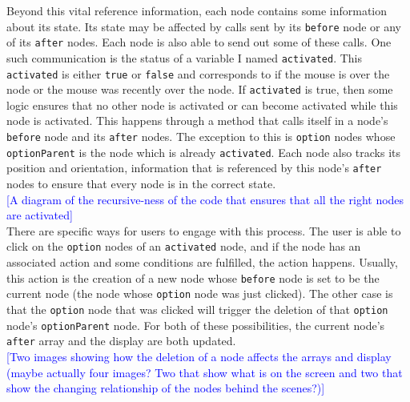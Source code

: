 \documentclass[12pt,twoside]{reedthesis}
\newcommand{\code}[1]{\texttt{#1}}
\begin{document}
	Beyond this vital reference information, each node contains some information about its state. Its state may be affected by calls sent by its \code{before} node or any of its \code{after} nodes. Each node is also able to send out some of these calls. One such communication is the status of a variable I named \code{activated}. This \code{activated} is either \code{true} or \code{false} and corresponds to if the mouse is over the node or the mouse was recently over the node. If \code{activated} is true, then some logic ensures that no other node is activated or can become activated while this node is activated. This happens through a method that calls itself in a node's \code{before} node and its \code{after} nodes. The exception to this is \code{option} nodes whose \code{optionParent} is the node which is already \code{activated}. Each node also tracks its position and orientation, information that is referenced by this node's \code{after} nodes to ensure that every node is in the correct state.\\
	
	\textcolor{blue}{[A diagram of the recursive-ness of the code that ensures that all the right nodes are activated]}\\
	
	There are specific ways for users to engage with this process. The user is able to click on the \code{option} nodes of an \code{activated} node, and if the node has an associated action and some conditions are fulfilled, the action happens. Usually, this action is the creation of a new node whose \code{before} node is set to be the current node (the node whose \code{option} node was just clicked). The other case is that the \code{option} node that was clicked will trigger the deletion of that \code{option} node's \code{optionParent} node. For both of these possibilities, the current node's \code{after} array and the display are both updated.\\
	
	\textcolor{blue}{[Two images showing how the deletion of a node affects the arrays and display (maybe actually four images? Two that show what is on the screen and two that show the changing relationship of the nodes behind the scenes?)]}\\
	
\end{document}
